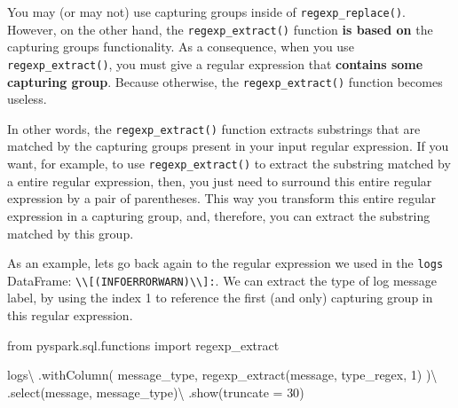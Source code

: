 \documentclass[
  11pt,
  letterpaper,
  DIV=11,
  numbers=noendperiod]{scrreprt}
\newenvironment{Shaded}{\begin{snugshade}}{\end{snugshade}}
\newcommand{\DecValTok}[1]{\textcolor[rgb]{0.68,0.00,0.00}{#1}}
\newcommand{\ImportTok}[1]{\textcolor[rgb]{0.00,0.46,0.62}{#1}}
\newcommand{\NormalTok}[1]{\textcolor[rgb]{0.00,0.23,0.31}{#1}}
\newcommand{\OperatorTok}[1]{\textcolor[rgb]{0.37,0.37,0.37}{#1}}
\newcommand{\StringTok}[1]{\textcolor[rgb]{0.13,0.47,0.30}{#1}}
\begin{document}
You may (or may not) use capturing groups inside of
\texttt{regexp\_replace()}. However, on the other hand, the
\texttt{regexp\_extract()} function \textbf{is based on} the capturing
groups functionality. As a consequence, when you use
\texttt{regexp\_extract()}, you must give a regular expression that
\textbf{contains some capturing group}. Because otherwise, the
\texttt{regexp\_extract()} function becomes useless.

In other words, the \texttt{regexp\_extract()} function extracts
substrings that are matched by the capturing groups present in your
input regular expression. If you want, for example, to use
\texttt{regexp\_extract()} to extract the substring matched by a entire
regular expression, then, you just need to surround this entire regular
expression by a pair of parentheses. This way you transform this entire
regular expression in a capturing group, and, therefore, you can extract
the substring matched by this group.

As an example, lets go back again to the regular expression we used in
the \texttt{logs} DataFrame:
\texttt{\textbackslash{}\textbackslash{}{[}(INFO\textbar{}ERROR\textbar{}WARN)\textbackslash{}\textbackslash{}{]}:}.
We can extract the type of log message label, by using the index 1 to
reference the first (and only) capturing group in this regular
expression.

\begin{Shaded}
\begin{Highlighting}[]
\ImportTok{from}\NormalTok{ pyspark.sql.functions }\ImportTok{import}\NormalTok{ regexp\_extract}

\NormalTok{logs}\OperatorTok{\textbackslash{}}
\NormalTok{    .withColumn(}
        \StringTok{\textquotesingle{}message\_type\textquotesingle{}}\NormalTok{,}
\NormalTok{        regexp\_extract(}\StringTok{\textquotesingle{}message\textquotesingle{}}\NormalTok{, type\_regex, }\DecValTok{1}\NormalTok{)}
\NormalTok{    )}\OperatorTok{\textbackslash{}}
\NormalTok{    .select(}\StringTok{\textquotesingle{}message\textquotesingle{}}\NormalTok{, }\StringTok{\textquotesingle{}message\_type\textquotesingle{}}\NormalTok{)}\OperatorTok{\textbackslash{}}
\NormalTok{    .show(truncate }\OperatorTok{=} \DecValTok{30}\NormalTok{)}
\end{Highlighting}
\end{Shaded}
\end{document}
